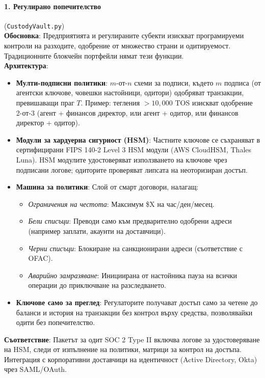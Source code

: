 \documentclass[11pt]{article}
\begin{document}
\paragraph{1. Регулирано попечителство} (\texttt{CustodyVault.py})\\
\textbf{Обосновка}: Предприятията и регулираните субекти изискват програмируеми контроли на разходите, одобрение от множество страни и одитируемост. Традиционните блокчейн портфейли нямат тези функции.\\
\textbf{Архитектура}:
\begin{itemize}[noitemsep]
  \item \textbf{Мулти-подписни политики}: $m$-от-$n$ схеми за подписи, където $m$ подписа (от агентски ключове, човешки настойници, одитори) одобряват транзакции, превишаващи праг $T$. Пример: тегления $>10,000$ TOS изискват одобрение 2-от-3 (агент + финансов директор, или агент + одитор, или финансов директор + одитор).
  \item \textbf{Модули за хардуерна сигурност (HSM)}: Частните ключове се съхраняват в сертифицирани FIPS 140-2 Level 3 HSM модули (AWS CloudHSM, Thales Luna). HSM модулите удостоверяват използването на ключове чрез подписани логове; одиторите проверяват липсата на неоторизиран достъп.
  \item \textbf{Машина за политики}: Слой от смарт договори, налагащ:
    \begin{itemize}[noitemsep]
      \item \emph{Ограничения на честота}: Максимум \$X на час/ден/месец.
      \item \emph{Бели списъци}: Преводи само към предварително одобрени адреси (например заплати, акаунти на доставчици).
      \item \emph{Черни списъци}: Блокиране на санкционирани адреси (съответствие с OFAC).
      \item \emph{Аварийно замразяване}: Инициирана от настойника пауза на всички операции до приключване на разследването.
    \end{itemize}
  \item \textbf{Ключове само за преглед}: Регулаторите получават достъп само за четене до баланси и история на транзакции без контрол върху средства, позволявайки одити без попечителство.
\end{itemize}
\textbf{Съответствие}: Пакетът за одит SOC 2 Type II включва логове за удостоверяване на HSM, следи от изпълнение на политики, матрици за контрол на достъпа. Интеграция с корпоративни доставчици на идентичност (Active Directory, Okta) чрез SAML/OAuth.
\end{document}
